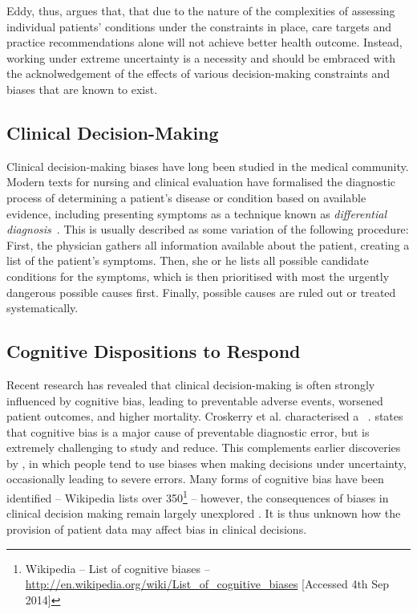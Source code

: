 \documentclass{sigchi}
\begin{document}
Eddy, thus, argues that, that due to the nature of the complexities of assessing individual patients' conditions under the constraints in place, care targets and practice recommendations alone will not achieve better health outcome.  Instead, working under extreme uncertainty is a necessity and should be embraced with the acknolwedgement of the effects of various decision-making constraints and biases that are known to exist.

\subsection{Clinical Decision-Making} 

Clinical decision-making biases have long been studied in the medical community.  
Modern texts for nursing and clinical evaluation have formalised the diagnostic process of determining a patient's disease or condition based on available evidence, including presenting symptoms as a technique known as \emph{differential diagnosis}~\cite{thompson2002clinical}.  This is usually described as some variation of the following procedure: First, the physician gathers all information available about the patient, creating a list of the patient's symptoms.  Then, she or he lists all possible candidate conditions for the symptoms, which is then prioritised with most the urgently dangerous possible causes first.  Finally, possible causes are ruled out or treated systematically.  

\subsection{Cognitive Dispositions to Respond}

Recent research has revealed that clinical decision-making is often strongly influenced by cognitive bias, leading to preventable adverse events, worsened patient outcomes, and higher mortality.  Croskerry et al. characterised a ~\cite{Croskerry2013}. \cite{Graber2002} states that cognitive bias is a major cause of preventable diagnostic error, but is extremely challenging to study and reduce. This complements earlier discoveries by \cite{Kahneman1982}, in which people tend to use biases when making decisions under uncertainty, occasionally leading to severe errors. Many forms of cognitive bias have been identified -- Wikipedia lists over 350\footnote{Wikipedia -- List of cognitive biases -- \url{http://en.wikipedia.org/wiki/List_of_cognitive_biases} [Accessed 4th Sep 2014]} -- however, the consequences of biases in clinical decision making remain largely unexplored \cite{Croskerry2013}. It is thus unknown how the provision of patient data may affect bias in clinical decisions.
\end{document}
